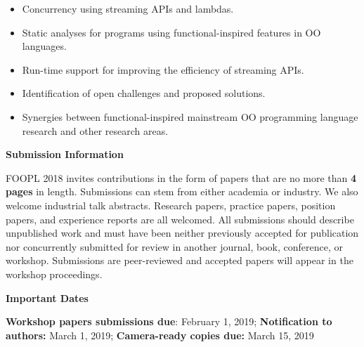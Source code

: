 \documentclass[10pt, conference]{IEEEtran}
\newcommand{\shortname}{FOOPL}
\begin{document}
\begin{itemize}
	\item Concurrency using streaming APIs and lambdas.

	\item Static analyses for programs using functional-inspired features in OO languages.

	\item Run-time support for improving the efficiency of streaming APIs.

	\item Identification of open challenges and proposed solutions.

	\item Synergies between
		functional-inspired mainstream OO programming language research
		and other research areas.

\end{itemize}

\noindent
\textbf{\large Submission Information}

\shortname{} 2018 invites contributions in the form of papers that are no more than \textbf{4 pages} in length. Submissions can stem from either academia or industry. We also welcome industrial talk abstracts. Research papers, practice papers, position papers, and experience reports are all welcomed. All submissions should describe unpublished work and must have been neither previously accepted for publication nor concurrently submitted for review in another journal, book, conference, or workshop. Submissions are peer-reviewed and accepted papers will appear in the workshop proceedings.

\noindent
\textbf{\large Important Dates}

\textbf{Workshop papers submissions due}: February 1, 2019; \textbf{Notification to authors:} March 1, 2019; \textbf{Camera-ready copies due:} March 15, 2019

\end{document}
